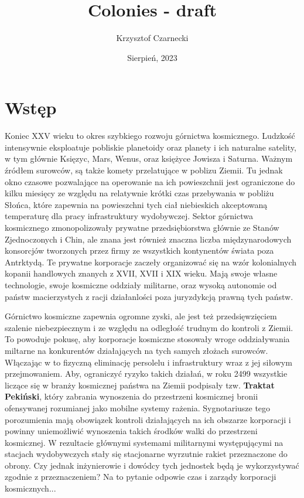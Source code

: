 \documentclass[11pt,a4paper]{article}
\begin{document}
\title{Colonies - draft}
\author{Krzysztof Czarnecki}
\date{Sierpień, 2023}
\maketitle

\section{Wstęp}

Koniec XXV wieku to okres szybkiego rozwoju górnictwa kosmicznego. Ludzkość intensywnie eksploatuje pobliskie planetoidy oraz planety i ich naturalne satelity, w tym głównie Księzyc, Mars, Wenus, oraz księżyce Jowisza i Saturna. Ważnym źródłem surowców, są także komety przelatujące w poblizu Ziemii. Tu jednak okno czasowe pozwalające na operowanie na ich powieszchnii jest ograniczone do kilku miesięcy ze względu na relatywnie krótki czas przebywania w pobliżu Słońca, które zapewnia na powieszchni tych ciał niebieskich akceptowaną temperaturę dla pracy infrastruktury wydobywczej. Sektor górnictwa kosmicznego zmonopolizowały prywatne przedsiębiorstwa głównie ze Stanów Zjednoczonych i Chin, ale znana jest również znaczna liczba międzynarodowych konsorcjów tworzonych przez firmy ze wszystkich kontynentów świata poza Antrktydą. Te prywatne korporacje zaczeły organizować się na wzór kolonialnych kopanii handlowych znanych z XVII, XVII i XIX wieku. Mają swoje własne technologie, swoje kosmiczne oddziały militarne, oraz wysoką autonomie od państw macierzystych z racji działanlości poza juryzdykcją prawną tych państw.  

Górnictwo kosmiczne zapewnia ogromne zyski, ale jest też przedsięwzięciem szalenie niebezpiecznym i ze względu na odległość trudnym do kontroli z Ziemii. To powoduje pokusę, aby korporacje kosmiczne stosowały wroge oddziaływania miltarne na konkurentów działających na tych samych złożach surowców. Włączając w to fizyczną eliminację persolelu i infrastruktury wraz z jej siłowym przejmowaniem. Aby, ograniczyć ryzyko takich działań, w roku 2499 wszystkie liczące się w branży kosmicznej państwa na Ziemii podpisały tzw. \textbf{Traktat Pekiński}, który zabrania wynoszenia do przestrzeni kosmicznej bronii ofensywanej rozumianej jako mobilne systemy rażenia. Sygnotariusze tego porozumienia mają obowiązek kontroli działających na ich obszarze korporacji i powinny uniemożliwić wynoszenia takich środków walki do przestrzeni kosmicznej. W rezultacie głównymi systemami militarnymi występującymi na stacjach wydobywczych stały się stacjonarne wyrzutnie rakiet przeznaczone do obrony. Czy jednak inżynierowie i dowódcy tych jednostek będą je wykorzystywać zgodnie z przeznaczeniem? Na to pytanie odpowie czas i zarządy korporacji kosmicznych...
\end{document}

